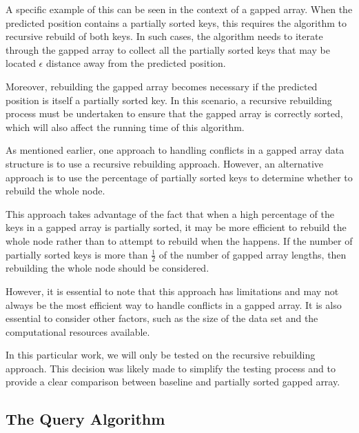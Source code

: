 A specific example of this can be seen in the context of a gapped array. When the predicted position contains a partially sorted keys, this requires the algorithm to recursive rebuild of both keys. In such cases, the algorithm needs to iterate through the gapped array to collect all the partially sorted keys that may be located $\epsilon$ distance away from the predicted position.

Moreover, rebuilding the gapped array becomes necessary if the predicted position is itself a partially sorted key. In this scenario, a recursive rebuilding process must be undertaken to ensure that the gapped array is correctly sorted, which will also affect the running time of this algorithm.

As mentioned earlier, one approach to handling conflicts in a gapped array data structure is to use a recursive rebuilding approach. However, an alternative approach is to use the percentage of partially sorted keys to determine whether to rebuild the whole node.

This approach takes advantage of the fact that when a high percentage of the keys in a gapped array is partially sorted, it may be more efficient to rebuild the whole node rather than to attempt to rebuild when the \conflict happens. If the number of partially sorted keys is more than $\frac{1}{2}$ of the number of gapped array lengths, then rebuilding the whole node should be considered.

However, it is essential to note that this approach has limitations and may not always be the most efficient way to handle conflicts in a gapped array. It is also essential to consider other factors, such as the size of the data set and the computational resources available.

In this particular work, we will only be tested on the recursive rebuilding approach. This decision was likely made to simplify the testing process and to provide a clear comparison between baseline and partially sorted gapped array. 


\subsection{The Query Algorithm}


